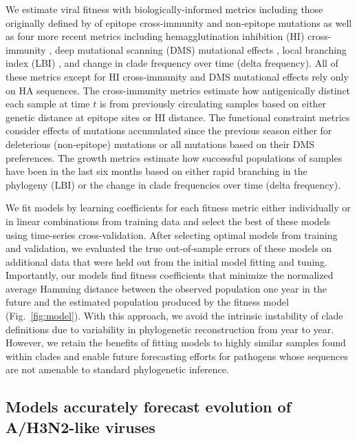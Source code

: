 We estimate viral fitness with biologically-informed metrics including those originally defined by \cite{Luksza:2014hj} of epitope cross-immunity and non-epitope mutations as well as four more recent metrics including hemagglutination inhibition (HI) cross-immunity \cite{Neher:2016hy}, deep mutational scanning (DMS) mutational effects \cite{Lee2018}, local branching index (LBI) \cite{Neher:2014eu}, and change in clade frequency over time (delta frequency).
All of these metrics except for HI cross-immunity and DMS mutational effects rely only on HA sequences.
The cross-immunity metrics estimate how antigenically distinct each sample at time $t$ is from previously circulating samples based on either genetic distance at epitope sites or HI distance.
The functional constraint metrics consider effects of mutations accumulated since the previous season either for deleterious (non-epitope) mutations or all mutations based on their DMS preferences.
The growth metrics estimate how successful populations of samples have been in the last six months based on either rapid branching in the phylogeny (LBI) or the change in clade frequencies over time (delta frequency).

We fit models by learning coefficients for each fitness metric either individually or in linear combinations from training data and select the best of these models using time-series cross-validation.
After selecting optimal models from training and validation, we evaluated the true out-of-sample errors of these models on additional data that were held out from the initial model fitting and tuning.
Importantly, our models find fitness coefficients that minimize the normalized average Hamming distance between the observed population one year in the future and the estimated population produced by the fitness model (Fig.~\ref{fig:model}).
With this approach, we avoid the intrinsic instability of clade definitions due to variability in phylogenetic reconstruction from year to year.
However, we retain the benefits of fitting models to highly similar samples found within clades and enable future forecasting efforts for pathogens whose sequences are not amenable to standard phylogenetic inference.

\subsection*{Models accurately forecast evolution of A/H3N2-like viruses}

